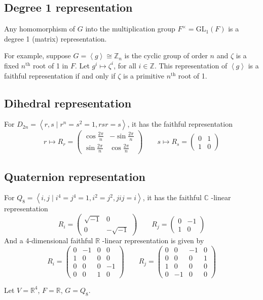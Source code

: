 \subsection{Degree 1 representation}

Any homomorphism of $G$ into the multiplication group $F^{\times}=\mathrm{GL}_{1}(F)$ is a degree 1 (matrix) representation.

For example, suppose $G= \left< g \right>\cong \mathbb{Z}_n$ is the cyclic group of order $n$ and $\zeta$ is a fixed $n^{\text{th}}$ root of 1 in $F$. Let $g^{i}\mapsto \zeta^{i}$, for all $i\in \mathbb{Z}$. This representation of $\left< g \right>$ is a faithful representation if and only if $\zeta$ is a primitive $n^{\text{th}}$ root of 1.

\subsection{Dihedral representation}

For $D_{2n}=\left< r,s\mid r^{n}=s^2=1,rsr=s \right>$, it has the faithful representation
\[
r\mapsto R_{r}=\begin{pmatrix}
\cos\frac{2\pi}{n} & -\sin\frac{2\pi}{n} \\
\sin\frac{2\pi}{n} & \cos\frac{2\pi}{n}
\end{pmatrix}\qquad s\mapsto R_{s}=\begin{pmatrix}
0 & 1 \\
1 & 0
\end{pmatrix}
\]
\subsection{Quaternion representation}

For $Q_8= \left< i,j\mid i^{4}=j^{4}=1,i^2=j^{2},jij=i \right>$, it has the faithful $\mathbb{C}$ -linear representation
\[
R_{i}=\begin{pmatrix}
\sqrt{ -1 } & 0 \\
0 & -\sqrt{ -1 }
\end{pmatrix}\qquad R_{j}=\begin{pmatrix}
0 & -1 \\
1 & 0
\end{pmatrix}
\]
And a 4-dimensional faithful $\mathbb{R}$ -linear representation is given by
\[
R_i=\begin{pmatrix}
0 & -1 & 0 & 0 \\
1 & 0 & 0 & 0 \\
0 & 0 & 0 & -1 \\
0 & 0 & 1 & 0
\end{pmatrix}\qquad R_j=\begin{pmatrix}
0 & 0 & -1 & 0 \\
0 & 0 & 0 & 1 \\
1 & 0 & 0 & 0 \\
0 & -1 & 0 & 0
\end{pmatrix}
\]
\begin{note}
Let $V=\mathbb{R}^{4}$, $F=\mathbb{R}$, $G=Q_8$.
\end{note}
